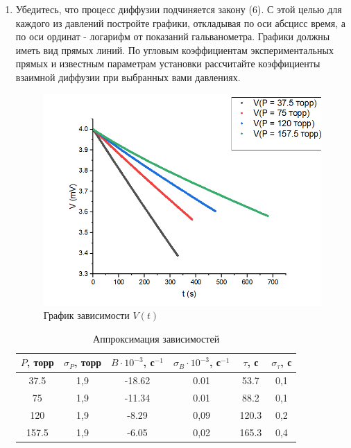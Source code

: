 \documentclass[12pt]{article}
\begin{document}
\begin{enumerate}
        \item Убедитесь, что процесс диффузии подчиняется закону (6). 
        С этой целью для каждого из давлений постройте графики, 
        откладывая по оси абсцисс время, а по оси ординат - логарифм 
        от показаний гальванометра. Графики должны иметь вид прямых 
        линий. По угловым коэффициентам экспериментальных прямых и 
        известным параметрам установки рассчитайте коэффициенты взаимной 
        диффузии при выбранных вами давлениях.
        \begin{figure} [H]
            \caption{График зависимости $V(t)$}
            \centering 
            \includegraphics[scale=0.7]{image.png} 
        \end{figure}
        \begin{table}[H]
            \centering
            \begin{tabular}{|c|c|c|c|c|c|}
                \hline
                $ P $, торр & $ \sigma_P $, торр & $ B \cdot 10^{-3} $, с$ ^{-1} $ & $ \sigma_{B} \cdot 10^{-3} $, с$ ^{-1} $ & $ \tau $, с & $ \sigma_\tau $, с \\ \hline
                37.5 & 1,9 & -18.62 & 0.01 & 53.7 & 0,1 \\ \hline
                75 & 1,9 & -11.34 & 0.01 & 88.2 & 0,1 \\ \hline
                120 & 1,9 & -8.29 & 0,09 & 120.3 & 0,2 \\ \hline
                157.5 & 1,9 & -6.05 & 0,02 & 165.3 & 0,4 \\ \hline
            \end{tabular}
            \caption{Аппроксимация зависимостей}

\end{table}
\end{enumerate}
\end{document}
